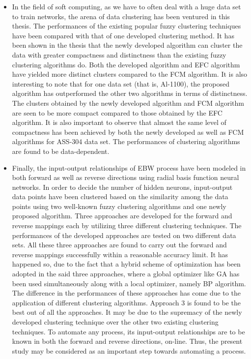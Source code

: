 \begin{itemize}

\item In the field of soft computing, as we have to often deal with a  
huge data set to train networks, the arena of data clustering has been 
ventured in this thesis. The performances of the existing popular fuzzy 
clustering techniques have been compared with that of one developed 
clustering method. It has been shown in the thesis that the newly 
developed algorithm can cluster the data with greater compactness and 
distinctness than the existing fuzzy clustering algorithms do. Both the 
developed algorithm and EFC algorithm have yielded more 
distinct clusters compared to the FCM algorithm. It is also 
interesting to note that for one data set (that is, Al-1100), the 
proposed algorithm has outperformed the other two algorithms in 
terms of distinctness. The clusters obtained by the newly developed  
algorithm and FCM algorithm are seen to be more compact compared to 
those obtained by the EFC algorithm. It is also important to observe 
that almost the same level of compactness has been achieved by both the 
newly developed as well as FCM algorithms for ASS-304 data set.
The performances of clustering algorithms are found to be data-dependent.







\item Finally, the input-output relationships of EBW process have been 
modeled in both forward as well as reverse directions using radial basis 
function neural networks. In order to decide the number of 
hidden neurons, input-output data points have been clustered based on the 
similarity among the data points using two well-known fuzzy clustering 
algorithms and one newly proposed algorithm. Three approaches are 
developed for the forward and reverse mappings each by utilizing three 
different clustering techniques. The performances of the developed 
approaches are tested on two different data sets. All these three 
approaches are found to carry out the forward and reverse mappings 
successfully within a reasonable accuracy limit. It has happened so, due 
to the fact that a hybrid scheme of optimization has been adopted in the 
said three approaches, where a global optimizer like GA has been used 
simultaneously along with a local optimizer, namely BP algorithm. The 
difference in the performances of these approaches has come due to the 
application of different clustering algorithms. Approach 3 is found to 
be the best out of all the approaches. It may be due to the supremacy of 
the newly developed clustering technique over the other two existing 
clustering techniques. To automate any process, its input-output relationships are to be known in both the forward and reverse directions, on-line. Thus, the present study may be considered as an important step towards automating a process.
\end{itemize}
